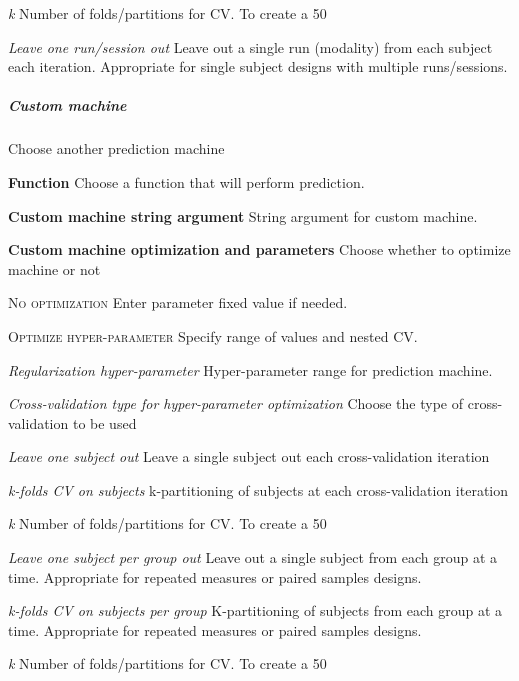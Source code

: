 \textit{k}
Number of folds/partitions for CV. To create a 50%


\textit{Leave one run/session out}
Leave out a single run (modality) from each subject each iteration. Appropriate for single subject designs with multiple runs/sessions.


\subparagraph{Custom machine}
Choose another prediction machine


\textbf{Function}
Choose a function that will perform prediction.


\textbf{Custom machine string argument}
String argument for custom machine.


\textbf{Custom machine optimization and parameters}
Choose whether to optimize machine or not


\textsc{No optimization}
Enter parameter fixed value if needed.


\textsc{Optimize hyper-parameter}
Specify range of values and nested CV.


\textsl{Regularization hyper-parameter}
Hyper-parameter range for prediction machine.


\textsl{Cross-validation type for hyper-parameter optimization}
Choose the type of cross-validation to be used


\textit{Leave one subject out}
Leave a single subject out each cross-validation iteration


\textit{k-folds CV on subjects}
k-partitioning of subjects at each cross-validation iteration


\textit{k}
Number of folds/partitions for CV. To create a 50%


\textit{Leave one subject per group out}
Leave out a single subject from each group at a time. Appropriate for repeated measures or paired samples designs.


\textit{k-folds CV on subjects per group}
K-partitioning of subjects from each group at a time. Appropriate for repeated measures or paired samples designs.


\textit{k}
Number of folds/partitions for CV. To create a 50%


